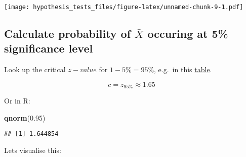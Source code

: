 \documentclass[]{article}
\newenvironment{Shaded}{\begin{snugshade}}{\end{snugshade}}
\newcommand{\KeywordTok}[1]{\textcolor[rgb]{0.13,0.29,0.53}{\textbf{#1}}}
\newcommand{\FloatTok}[1]{\textcolor[rgb]{0.00,0.00,0.81}{#1}}
\newcommand{\NormalTok}[1]{#1}
\begin{document}
\texttt{[image: hypothesis\_tests\_files/figure-latex/unnamed-chunk-9-1.pdf]}

\subsection{\texorpdfstring{Calculate probability of \(\bar{X}\)
occuring at 5\% significance
level}{Calculate probability of \textbackslash{}bar\{X\} occuring at 5\% significance level}}\label{calculate-probability-of-barx-occuring-at-5-significance-level}

Look up the critical \(z-value\) for \(1-5\% = 95\%\), e.g.~in this
\href{http://www.z-table.com/}{table}.

\[ c = z_{95 \%} \approx 1.65 \]

Or in R:

\begin{Shaded}
\begin{Highlighting}[]
\KeywordTok{qnorm}\NormalTok{(}\FloatTok{0.95}\NormalTok{)}
\end{Highlighting}
\end{Shaded}

\begin{verbatim}
## [1] 1.644854
\end{verbatim}

Lets visualise this:
\end{document}
